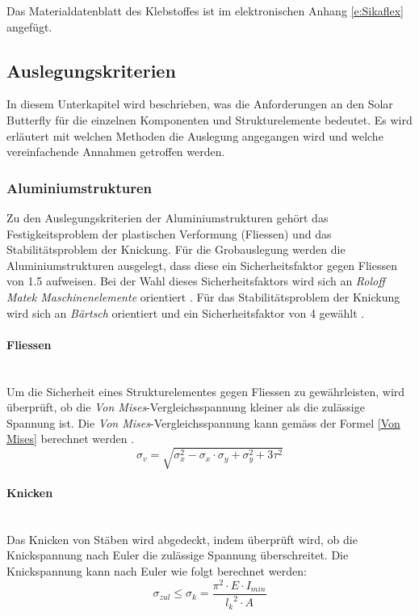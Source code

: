 Das Materialdatenblatt des Klebstoffes ist im elektronischen Anhang \ref{e:Sikaflex} angefügt.
\newpage

\subsection{Auslegungskriterien}
In diesem Unterkapitel wird beschrieben, was die Anforderungen an den Solar Butterfly für die einzelnen Komponenten und Strukturelemente bedeutet. Es wird erläutert mit welchen Methoden die Auslegung angegangen wird und welche vereinfachende Annahmen getroffen werden.

  \subsubsection{Aluminiumstrukturen}
  Zu den Auslegungskriterien der Aluminiumstrukturen gehört das Festigkeitsproblem der plastischen Verformung (Fliessen) und das Stabilitätsproblem der Knickung. Für die Grobauslegung werden die Aluminiumstrukturen ausgelegt, dass diese ein Sicherheitsfaktor gegen Fliessen von 1.5 aufweisen. Bei der Wahl dieses Sicherheitsfaktors wird sich an \emph{Roloff Matek Maschinenelemente} orientiert \cite{Roloff}. Für das Stabilitätsproblem der Knickung wird sich an \emph{Bärtsch} orientiert und ein Sicherheitsfaktor von 4 gewählt \cite{Baertsch}.

  \paragraph{Fliessen}\mbox{}\\
  Um die Sicherheit eines Strukturelementes gegen Fliessen zu gewährleisten, wird überprüft, ob die \emph{Von Mises}-Vergleichsspannung kleiner als die zulässige Spannung ist. Die \emph{Von Mises}-Vergleichsspannung kann gemäss der Formel \ref{Von Mises} berechnet werden \cite{Baertsch}.
  \begin{equation}
    \label{Von Mises}
    \sigma_v = \sqrt{\sigma_x^{2}-\sigma_x \cdot \sigma_y + \sigma_y^2 + 3\tau^2}
  \end{equation}

  \paragraph{Knicken}\mbox{}\\
  Das Knicken von Stäben wird abgedeckt, indem überprüft wird, ob die Knickspannung nach Euler die zulässige Spannung überschreitet. Die Knickspannung kann nach Euler wie folgt berechnet werden:
  \begin{equation}
    \sigma_{zul} \leq \sigma_k = \frac{\pi^2 \cdot E \cdot I_{min}}{{l_k}^2 \cdot A}
  \end{equation}

